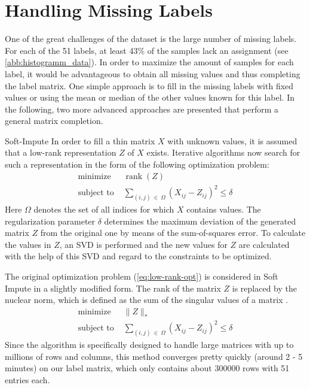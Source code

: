 \section{Handling Missing Labels}
One of the great challenges of the dataset is the large number of missing labels. For each of the 51 labels, at least 43\% of the samples lack an assignment (see \ref{abb:histogramm_data}). In order to maximize the amount of samples for each label, it would be advantageous to obtain all missing values and thus completing the label matrix. One simple approach is to fill in the missing labels with fixed values or using the mean or median of the other values known for this label. In the following, two more advanced approaches are presented that perform a general matrix completion.

\begin{subsection}{Soft-Impute}
	In order to fill a thin matrix $X$ with unknown values, it is assumed that a low-rank representation $Z$ of $X$ exists. Iterative algorithms now search for such a representation in the form of the following optimization problem:
	\begin{equation} \label{eq:low-rank-opt}
		\begin{split}
			\text{minimize } &\operatorname{rank}(Z) \\
			\text{subject to } &\sum_{(i,j)\:\in\: \Omega} (X_{ij} - Z_{ij})^2 \leq \delta
		\end{split}	
	\end{equation}
	Here $\Omega$ denotes the set of all indices for which $X$ contains values. The regularization parameter $\delta$ determines the maximum deviation of the generated matrix $Z$ from the original one by means of the sum-of-squares error. To calculate the values in $Z$, an SVD is performed and the new values for $Z$ are calculated with the help of this SVD and regard to the constraints to be optimized.\par
	The original optimization problem (\ref{eq:low-rank-opt}) is considered in Soft Impute in a slightly modified form. The rank of the matrix $Z$ is replaced by the nuclear norm, which is defined as the sum of the singular values of a matrix \cite{mazumder2010spectral}.
	\begin{equation} \label{eq:low-rank-soft-opt}
	\begin{split}
	\text{minimize } & \| Z \|_* \\
	\text{subject to } &\sum_{(i,j)\:\in\: \Omega} (X_{ij} - Z_{ij})^2 \leq \delta
	\end{split}
	\end{equation}
	Since the algorithm is specifically designed to handle large matrices with up to millions of rows and columns, this method converges pretty quickly (around 2 - 5 minutes) on our label matrix, which only contains about 300000 rows with 51 entries each. 
\end{subsection}

